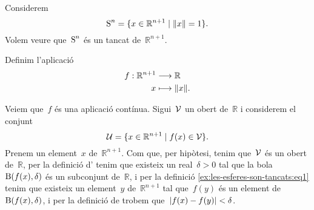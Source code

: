 \documentclass[../topologia.tex]{subfiles}
\begin{document}
    \begin{example}
        \label{ex:les-esferes-son-tancats}
        Considerem
        \[
            \esfera^{n}=\{x\in\mathbb{R}^{n+1}\mid\norm{x}=1\}.
        \]
        Volem veure que~\(\operatorname{S}^{n}\) és un tancat de~\(\mathbb{R}^{n+1}\).
    \end{example}
    \begin{solution}
        Definim l'aplicació
        \begin{align*}
            f:\mathbb{R}^{n+1}&\longrightarrow\mathbb{R} \\
            x&\longmapsto\norm{x}.
        \end{align*}
        \begin{comment}
            Veiem que~\(f\) és una aplicació tancada.
            Sigui~\(\tancat{C}\) un tancat de~\(\mathbb{R}^{n+1}\) i considerem el conjunt
            \[
                \tancat{K}=\{f(x)\in\mathbb{R}\mid x\in\tancat{C}\}.
            \]
            Tenim que~\(\tancat{K}\) és un tancat de~\(\mathbb{R}\), ja que si~\(y\) és un element de~\(\tancat{K}\), aleshores~\(y\neq f(x)\) per a tot~\(x\) de~\(\obert{C}\), i per tant existeix un real~\(d>0\) tal que
            \[
                d=\min_{x\in\tancat{C}}\abs{f(x)-y},
            \]
            i per tant tenim que per a tot~\(y\) de~\(\mathbb{R}\setminus\tancat{K}\) existeix una bola~\(\bola(y,d)\) tal que~\(\bola(y,d)\cap\tancat{K}=\emptyset\), i per la definició d'\myref{def:obert-espai-metric} trobem que~\(\mathbb{R}\setminus\tancat{K}\) és un obert de~\(\mathbb{R}\).
            Aleshores per la definició de \myref{def:tancat} trobem que~\(\tancat{K}\) és un tancat, i per la definició d'\myref{def:aplicacio-tancada} trobem que~\(f\) és una aplicació tancada.

            Ara bé, tenim que~\(\{1\}\) és un tancat de~\(\mathbb{R}\)
        \end{comment}
        Veiem que~\(f\) és una aplicació contínua.
        Sigui~\(\mathcal{V}\) un obert de~\(\mathbb{R}\) i considerem el conjunt
        \begin{equation}
            \label{ex:les-esferes-son-tancats:eq1}
            \mathcal{U}=\{x\in\mathbb{R}^{n+1}\mid f(x)\in\mathcal{V}\}.
        \end{equation}
        Prenem un element~\(x\) de~\(\mathbb{R}^{n+1}\).
        Com que, per hipòtesi, tenim que~\(\mathcal{V}\) és un obert de~\(\mathbb{R}\), per la definició d' tenim que existeix un real~\(\delta>0\) tal que la bola~\(\operatorname{B}(f(x),\delta)\) és un subconjunt de~\(\mathbb{R}\), i per la definició \eqref{ex:les-esferes-son-tancats:eq1} tenim que existeix un element~\(y\) de~\(\mathbb{R}^{n+1}\) tal que~\(f(y)\) és un element de~\(\operatorname{B}(f(x),\delta)\), i per la definició de  trobem que~\(\abs{f(x)-f(y)}<\delta\).
    \end{solution}
\end{document}
